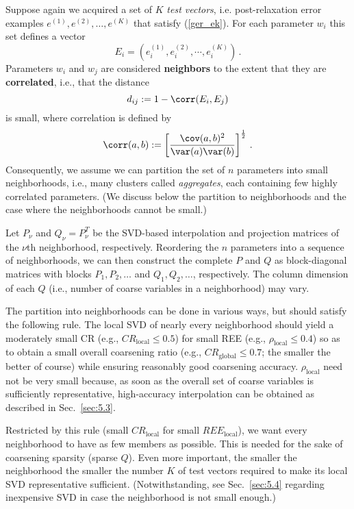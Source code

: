 \documentclass{article} %
\begin{document}
Suppose again we acquired a set of $K$ {\it test vectors}, i.e. post-relaxation error examples $e^{(1)}, e^{(2)}, \dots, e^{(K)}$ that satisfy (\ref{ger_ek}). For each parameter $w_i$ this set defines a vector
$$
	E_i = \left( e^{(1)}_i, e^{(2)}_i, \cdots, e^{(K)}_i \right)\,.
$$
Parameters $w_i$ and $w_j$ are considered \textbf{neighbors} to the extent that they are \textbf{correlated}, i.e., that the distance
\begin{equation}
	d_{ij} := 1 - \corr(E_i, E_j)
	\label{dij}
\end{equation}
is small, where correlation is defined by
\begin{equation}
    \corr(a, b) := \left[\frac{\cov(a, b)^2}{\var(a) \var(b)}\right]^{\frac12}\,.
\end{equation}
Consequently, we assume we can partition the set of $n$ parameters into small neighborhoods, i.e., many clusters called {\it aggregates}, each containing few highly correlated parameters.  (We discuss below the partition to neighborhoods and the case where the neighborhoods cannot be small.)

Let $P_{\nu}$ and $Q_{\nu} = P_{\nu}^T$ be the SVD-based interpolation and projection matrices of the $\nu$th neighborhood, respectively. Reordering the $n$ parameters into a sequence of neighborhoods, we can then construct the complete $P$ and $Q$ as block-diagonal matrices with blocks $P_1, P_2, \dots$ and $Q_1, Q_2, \dots$, respectively. The column dimension of each $Q$ (i.e., number of coarse variables in a neighborhood) may vary.

The partition into neighborhoods can be done in various ways, but should satisfy the following rule. The local SVD of nearly every neighborhood should yield a moderately small CR (e.g., $CR_{\text{local}} \leq 0.5$) for small REE (e.g., $\rho_{\text{local}} \leq 0.4$) so as to obtain a small overall coarsening ratio (e.g., $CR_{\text{global}} \leq 0.7$; the smaller the better of course) while ensuring reasonably good coarsening accuracy. $\rho_{\text{local}}$ need not be very small because, as soon as the overall set of coarse variables is sufficiently representative, high-accuracy interpolation can be obtained as described in Sec.~\ref{sec:5.3}.

Restricted by this rule (small $CR_{\text{local}}$ for small $REE_{\text{local}}$), we want every neighborhood to have as few members as possible. This is needed for the sake of coarsening sparsity (sparse $Q$). Even more important, the smaller the neighborhood the smaller the number $K$ of test vectors required to make its local SVD representative sufficient. (Notwithstanding, see Sec.~\ref{sec:5.4} regarding inexpensive SVD in case the neighborhood is not small enough.)
\end{document}

